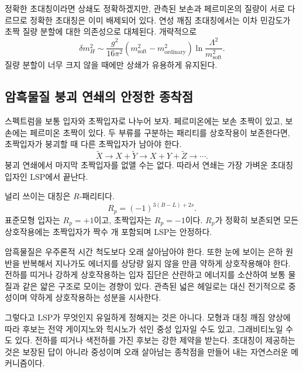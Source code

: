 정확한 초대칭이라면 상쇄도 정확하겠지만, 관측된 보손과 페르미온의 질량이 서로 다르므로 정확한 초대칭은 이미 배제되어 있다. 연성 깨짐 초대칭에서는 이차 민감도가 초짝 질량 분할에 대한 의존성으로 대체된다. 개략적으로
\begin{equation}
\delta m_H^2
\sim
\frac{g^2}{16\pi^2}
\left(m_{\mathrm{soft}}^2-m_{\mathrm{ordinary}}^2\right)
\ln\frac{\Lambda^2}{m_{\mathrm{soft}}^2}.
\end{equation}
질량 분할이 너무 크지 않을 때에만 상쇄가 유용하게 유지된다.

\subsection{암흑물질 붕괴 연쇄의 안정한 종착점}

스펙트럼을 보통 입자와 초짝입자로 나누어 보자. 페르미온에는 보손 초짝이 있고, 보손에는 페르미온 초짝이 있다. 두 부류를 구분하는 패리티를 상호작용이 보존한다면, 초짝입자가 붕괴할 때 다른 초짝입자가 남아야 한다.
\begin{equation}
\widetilde X
\longrightarrow X+\widetilde Y
\longrightarrow X+Y+\widetilde Z
\longrightarrow\cdots.
\end{equation}
붕괴 연쇄에서 마지막 초짝입자를 없앨 수는 없다. 따라서 연쇄는 가장 가벼운 초대칭 입자인 LSP에서 끝난다.

널리 쓰이는 대칭은 \(R\)-패리티다.
\begin{equation}
R_p=(-1)^{3(B-L)+2s}.
\end{equation}
표준모형 입자는 \(R_p=+1\)이고, 초짝입자는 \(R_p=-1\)이다. \(R_p\)가 정확히 보존되면 모든 상호작용에는 초짝입자가 짝수 개 포함되며 LSP는 안정하다.

암흑물질은 우주론적 시간 척도보다 오래 살아남아야 한다. 또한 눈에 보이는 은하 원반을 반복해서 지나가도 에너지를 상당량 잃지 않을 만큼 약하게 상호작용해야 한다. 전하를 띠거나 강하게 상호작용하는 입자 집단은 산란하고 에너지를 소산하여 보통 물질과 같은 얇은 구조로 모이는 경향이 있다. 관측된 넓은 헤일로는 대신 전기적으로 중성이며 약하게 상호작용하는 성분을 시사한다.

그렇다고 LSP가 무엇인지 유일하게 정해지는 것은 아니다. 모형과 대칭 깨짐 양상에 따라 후보는 전약 게이지노와 힉시노가 섞인 중성 입자일 수도 있고, 그래비티노일 수도 있다. 전하를 띠거나 색전하를 가진 후보는 강한 제약을 받는다. 초대칭이 제공하는 것은 보장된 답이 아니라 중성이며 오래 살아남는 종착점을 만들어 내는 자연스러운 메커니즘이다.

